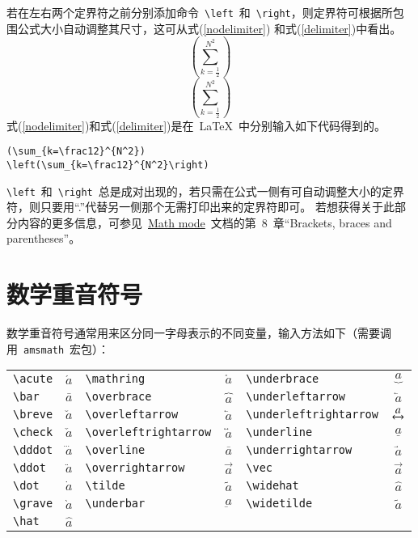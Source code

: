 若在左右两个定界符之前分别添加命令~\verb|\left|~和~\verb|\right|，则定界符可根据所包围公式大小自动调整其尺寸，这可从式(\ref{nodelimiter}) 和式(\ref{delimiter})中看出。
\begin{equation}\label{nodelimiter}
(\sum_{k=\frac12}^{N^2})
\end{equation}
\begin{equation}\label{delimiter}
\left(\sum_{k=\frac12}^{N^2}\right)
\end{equation}
式(\ref{nodelimiter})和式(\ref{delimiter})是在~\LaTeX~中分别输入如下代码得到的。
\begin{verbatim}
(\sum_{k=\frac12}^{N^2})
\left(\sum_{k=\frac12}^{N^2}\right)
\end{verbatim}
\verb|\left|~和~\verb|\right|~总是成对出现的，若只需在公式一侧有可自动调整大小的定界符，则只要用“.”代替另一侧那个无需打印出来的定界符即可。
若想获得关于此部分内容的更多信息，可参见~\href{http://tug.ctan.org/cgi-bin/ctanPackageInformation.py?id=voss-mathmode}{Math mode}~文档的第~8~章“Brackets, braces and parentheses”。

\section{数学重音符号}
数学重音符号通常用来区分同一字母表示的不同变量，输入方法如下（需要调用~\verb|amsmath|~宏包）：

\vspace{0.5em}\noindent\wuhao\begin{tabularx}{\textwidth}{Xc|Xc|Xc}
 \verb|\acute| & $\acute{a}$ & \verb|\mathring| & $\mathring{a}$ & \verb|\underbrace| & $\underbrace{a}$ \\
 \verb|\bar| & $\bar{a}$ & \verb|\overbrace| & $\overbrace{a}$ & \verb|\underleftarrow| & $\underleftarrow{a}$ \\
 \verb|\breve| & $\breve{a}$ & \verb|\overleftarrow| & $\overleftarrow{a}$ & \verb|\underleftrightarrow| & $\underleftrightarrow{a}$ \\
 \verb|\check| & $\check{a}$ & \verb|\overleftrightarrow| & $\overleftrightarrow{a}$ & \verb|\underline| & $\underline{a}$ \\
 \verb|\dddot| & $\dddot{a}$ & \verb|\overline| & $\overline{a}$ & \verb|\underrightarrow| & $\underrightarrow{a}$ \\
 \verb|\ddot| & $\ddot{a}$ & \verb|\overrightarrow| & $\overrightarrow{a}$ & \verb|\vec| & $\vec{a}$ \\
 \verb|\dot| & $\dot{a}$ & \verb|\tilde| & $\tilde{a}$ & \verb|\widehat| & $\widehat{a}$ \\
 \verb|\grave| & $\grave{a}$ & \verb|\underbar| & $\underbar{a}$ & \verb|\widetilde| & $\widetilde{a}$ \\
 \verb|\hat| & $\hat{a}$
\end{tabularx}\vspace{0.5em}

